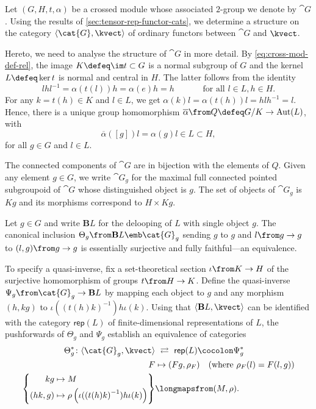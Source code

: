 Let \((G,H,t,\alpha)\) be a crossed module whose associated \(2\)\hyp{}group we denote by \(\cat{G}\).
Using the results of \cref{sec:tensor-rep-functor-cats},
we determine a \GV{} structure on the category
\(\langle\cat{G}, \kvect\rangle\) of ordinary functors between \(\cat{G}\) and \(\kvect\).

Hereto, we need to analyse the structure of \(\cat{G}\) in more detail.
By \cref{eq:cross-mod-def-rel}, the image \(K \defeq \im t \subset G\) is a normal subgroup of \(G\)
and the kernel \(L \defeq \ker t\) is normal and central in \(H\).
The latter follows from the identity
\[
  lhl^{-1} =\alpha(t(l))h = \alpha(e)h = h \qquad\quad \text{ for all } l\in L, h\in H.
\]
For any \(k=t(h) \in K\) and \(l\in L\), we get \(\alpha(k)l = \alpha(t(h))l = hlh^{-1}= l\).
Hence,
there is a unique group homomorphism
\(\overline{\alpha} \from Q \defeq G/K \to \mathrm{Aut}(L)\), with
\[
  \overline{\alpha}([g])l=\alpha(g)l \in L \subset H,
\]
for all \(g\in G\) and \(l\in L\).

The connected components of \(\cat{G}\) are in bijection with the elements of \(Q\).
Given any element \(g\in G\), we write \( \cat{G}_{g}\) for the maximal full connected pointed subgroupoid of \(\cat{G}\) whose distinguished object is \(g\).
The set of objects of \(\cat{G}_{g}\) is \(Kg\) and its morphisms correspond to \(H \times Kg\).

\begin{lemma}\label{lem:canonical-inclusion}
  Let \(g \in G\) and write \(\mathbf{B}L\) for the delooping of \(L\) with single object \(g\).
  The canonical inclusion \(\Theta_g \from \mathbf{B}L \emb \cat{G}_g\) sending \(g\) to \(g\) and \(l \from g\to g\) to \((l,g) \from g\to g\) is
  essentially surjective and fully faithful—an equivalence.
\end{lemma}

To specify a quasi-inverse,
fix a set-theoretical section \(\iota \from K \to H\) of
the surjective homomorphism of groups \(t\from H \to K\).
Define the quasi-inverse \(\Psi_g \from \cat{G}_g\to \mathbf{B}L\)
by mapping each object to \(g\) and any morphism \((h,kg)\) to \(\iota({(t(h)k)}^{-1}) h \iota(k)\).
Using that \(\langle \mathbf{B}L, \kvect\rangle\) can be identified with the category \(\mathsf{rep}(L)\) of finite\hyp{}dimensional representations of \(L\),
the pushforwards of \(\Theta_g\) and \(\Psi_g\) establish an equivalence of categories
\begin{equation}\label{eq:toopushy}
  \begin{aligned}
    \Theta_{g}^{*} \colon \langle \cat{G}_g, \kvect\rangle &\ \rightleftarrows\ \mathsf{rep}(L) \cocolon \Psi_g^{*} \\
    F &\mapsto (Fg,\rho_{F}) \quad \text{(where \(\rho_F(l) = F(l,g)\))} \\
    \left\{\begin{aligned}
      kg &\mapsto M\\
      (hk,g) &\mapsto \rho\left(\iota({(t(h)k)}^{-1}) h \iota(k)\right)
    \end{aligned}\right\} & \longmapsfrom (M, \rho).
  \end{aligned}
\end{equation}

